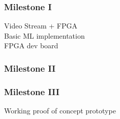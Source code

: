
\subsubsection{Milestone I}
Video Stream + FPGA\\
Basic ML implementation\\
FPGA dev board

\subsubsection{Milestone II}

\subsubsection{Milestone III}
Working proof of concept prototype